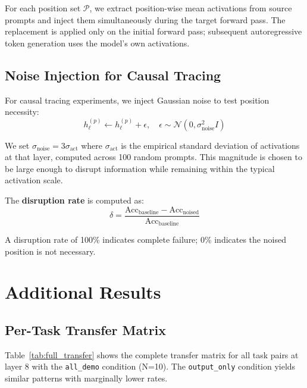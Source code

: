 \documentclass{article}
\begin{document}
For each position set $\mathcal{P}$, we extract position-wise mean activations from source prompts and inject them simultaneously during the target forward pass. The replacement is applied only on the initial forward pass; subsequent autoregressive token generation uses the model's own activations.

\subsection{Noise Injection for Causal Tracing}

For causal tracing experiments, we inject Gaussian noise to test position necessity:
\begin{equation}
    h_\ell^{(p)} \leftarrow h_\ell^{(p)} + \epsilon, \quad \epsilon \sim \mathcal{N}(0, \sigma_\text{noise}^2 I)
\end{equation}

We set $\sigma_\text{noise} = 3\sigma_\text{act}$ where $\sigma_\text{act}$ is the empirical standard deviation of activations at that layer, computed across 100 random prompts. This magnitude is chosen to be large enough to disrupt information while remaining within the typical activation scale.

The \textbf{disruption rate} is computed as:
\begin{equation}
    \delta = \frac{\text{Acc}_\text{baseline} - \text{Acc}_\text{noised}}{\text{Acc}_\text{baseline}}
\end{equation}

A disruption rate of 100\% indicates complete failure; 0\% indicates the noised position is not necessary.

\section{Additional Results}
\label{app:results}

\subsection{Per-Task Transfer Matrix}

Table~\ref{tab:full_transfer} shows the complete transfer matrix for all task pairs at layer 8 with the \texttt{all\_demo} condition (N=10). The \texttt{output\_only} condition yields similar patterns with marginally lower rates.
\end{document}
